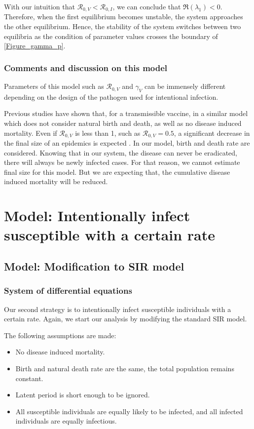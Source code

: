 \documentclass[12pt]{article}
\newcommand{\R}{\mathcal{R}}
\begin{document}
With our intuition that $\R_{0,V}<\R_{0,I}$, we can conclude that $\Re(\lambda_1)<0$. Therefore, when the first equilibrium becomes unstable, the system approaches the other equilibrium. Hence, the stability of the system switches between two equilibria as the condition of parameter values crosses the boundary of \autoref{Figure_gamma_p}.

\subsubsection{Comments and discussion on this model}

Parameters of this model such as $\R_{0,V}$ and $\gamma_V$ can be immensely different depending on the design of the pathogen used for intentional infection. 

Previous studies have shown that, for a transmissible vaccine, in a similar model which does not consider natural birth and death, as well as no disease induced mortality. Even if $\R_{0,V}$ is less than 1, such as $\R_{0,V}=0.5$, a significant decrease in the final size of an epidemics is expected \cite{nuismer2018controlling}. In our model, birth and death rate are considered. Knowing that in our system, the disease can never be eradicated, there will always be newly infected cases. For that reason, we cannot estimate final size for this model. But we are expecting that, the cumulative disease induced mortality will be reduced.

\section{Model: Intentionally infect susceptible with a certain rate}
\subsection{Model: Modification to SIR model}
\subsubsection{System of differential equations}
Our second strategy is to intentionally infect susceptible individuals with a certain rate. Again, we start our analysis by modifying the standard SIR model.

The following assumptions are made:
\begin{itemize}
\item No disease induced mortality.
\item Birth and natural death rate are the same, the total population remains constant.
\item Latent period is short enough to be ignored.
\item All susceptible individuals are equally likely to be infected, and all infected individuals are equally infectious.
\end{itemize}
\end{document}
